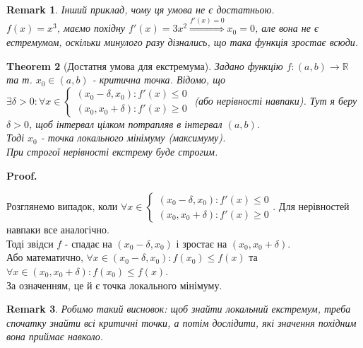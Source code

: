\documentclass[a4paper, 14pt]{article}
\makeatletter
\def\qed{$\blacksquare$}
\theoremstyle{theoremdd}
\newtheorem{theorem}{Theorem}[subsection]
\theoremstyle{theoremdd}
\theoremstyle{theoremdd}
\theoremstyle{theoremdd}
\theoremstyle{theoremdd}
\theoremstyle{theoremdd}
\newtheorem{remark}[theorem]{Remark}
\theoremstyle{theoremdd}
\theoremstyle{theoremdd}
\renewenvironment{proof}[1][Proof.\\]{\par
\pushQED{\hfill \qed}%
\normalfont \topsep6\p@\@plus6\p@\relax
\trivlist
\item\relax
{\bfseries
#1\@addpunct{.}}\hspace\labelsep\ignorespaces
}{%
\popQED\endtrivlist\@endpefalse
}
\makeatother
\begin{document}
\begin{remark}
Інший приклад, чому ця умова не є достатньою.\\
$f(x) = x^3$, маємо похідну $f'(x) = 3x^2 \overset{f'(x) = 0}{\Rightarrow} x_0 = 0$, але вона не є естремумом, оскільки минулого разу дізнались, що така функція зростає всюди.
\end{remark}

\begin{theorem}[Достатня умова для екстремума]
Задано функцію $f: (a,b) \to \mathbb{R}$ та т. $x_0 \in (a,b)$ - критична точка. Відомо, що \\ $\exists \delta > 0: \forall x \in \begin{cases} (x_0-\delta,x_0): f'(x) \leq 0 \\ (x_0,x_0+\delta): f'(x) \geq 0 \end{cases}$ (або нерівності навпаки). Тут я беру $\delta >0$, щоб інтервал цілком потрапляв в інтервал $(a,b)$.\\
Тоді $x_0$ - точка локального мінімуму (максимуму).\\
При строгої нерівності екстрему буде строгим.
\end{theorem}

\begin{proof}
Розглянемо випадок, коли $\forall x \in \begin{cases} (x_0-\delta,x_0): f'(x) \leq 0 \\ (x_0,x_0+\delta): f'(x) \geq 0 \end{cases}$. Для нерівностей навпаки все аналогічно.\\
Тоді звідси $f$ - спадає на $(x_0 - \delta, x_0)$ і зростає на $(x_0, x_0 + \delta)$.\\
Або математично, $\forall x \in (x_0-\delta, x_0): f(x_0) \leq f(x)$ та $\forall x \in (x_0, x_0+\delta): f(x_0) \leq f(x)$.\\
За означенням, це й є точка локального мінімуму.
\end{proof}

\begin{remark}
Робимо такий висновок: щоб знайти локальний екстремум, треба спочатку знайти всі критичні точки, а потім дослідити, які значення похідним вона приймає навколо.
\end{remark}
\end{document}
